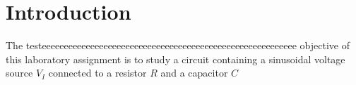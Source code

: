 \section{Introduction}
\label{sec:introduction}

The testeeeeeeeeeeeeeeeeeeeeeeeeeeeeeeeeeeeeeeeeeeeeeeeeeeeeeeeeee objective of this laboratory assignment is to study a circuit containing a
sinusoidal voltage source $V_I$ connected to a resistor $R$ and a capacitor $C$

